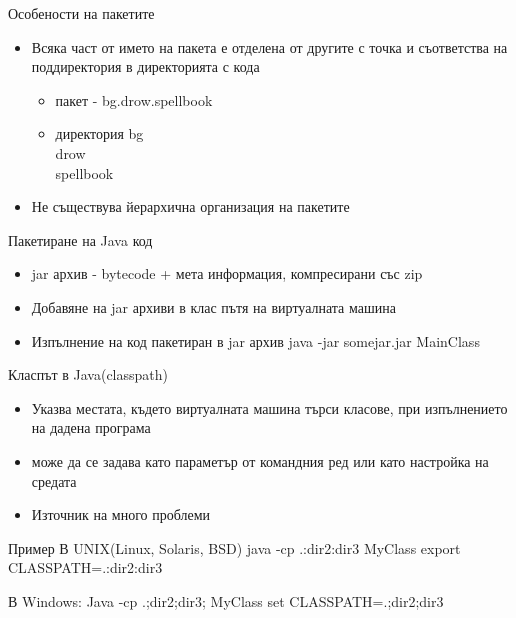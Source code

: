 \documentclass{beamer}
\begin{document}
\begin{frame}{Особености на пакетите}
  \transdissolve
  \begin{itemize}
  \item Всяка част от името на пакета е отделена от другите с точка и
    съответства на поддиректория в директорията с кода
    \begin{itemize}
      \item пакет - bg.drow.spellbook
      \item директория bg\\drow\\spellbook
    \end{itemize}
  \item Не съществува йерархична организация на пакетите
  \end{itemize}
\end{frame}

\begin{frame}{Пакетиране на Java код}
  \transdissolve
  \begin{itemize}
  \item jar архив - bytecode + мета информация, компресирани със zip
  \item Добавяне на jar архиви в клас пътя на виртуалната машина
  \item Изпълнение на код пакетиран в jar архив
    java -jar somejar.jar MainClass
  \end{itemize}
\end{frame}

\begin{frame}{Класпът в Java(classpath)}
  \transdissolve
  \begin{itemize}
  \item Указва местата, където виртуалната машина търси класове, при
    изпълнението на дадена програма
  \item може да се задава като параметър от командния ред или като
    настройка на средата
  \item Източник на много проблеми
  \end{itemize}
\end{frame}


\begin{frame}{Пример}
  \transdissolve
  В UNIX(Linux, Solaris, BSD)
  java -cp .:dir2:dir3 MyClass
  export CLASSPATH=.:dir2:dir3


  В Windows:
  Java -cp .;dir2;dir3; MyClass
  set CLASSPATH=.;dir2;dir3
\end{frame}
\end{document}
